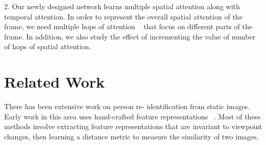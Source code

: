 \documentclass[sigconf, authordraft,review=false]{acmart}
\begin{document}
2. Our newly designed network learns multiple spatial attention along with temporal attention. In order to represent the overall 
spatial attention of the frame, we need multiple hops of attention ~\cite{lin2017structured} that focus on different parts of the frame. In addition, we also study the effect of incrementing the value of number of hops of spatial attention.

\section{Related Work}
There    has    been    extensive    work    on    person    re- identification from static images.   Early work in this area uses hand-crafted feature representations ~\cite{gray08_eccv,liao15_cvpr,ma12_workshop,matsukawa16_cvpr,zhao14_cvpr}. Most  of  these  methods  involve  extracting  feature  representations  that  are  invariant  to  viewpoint  changes,  then
learning a distance metric to measure the similarity of two images.
\end{document}
